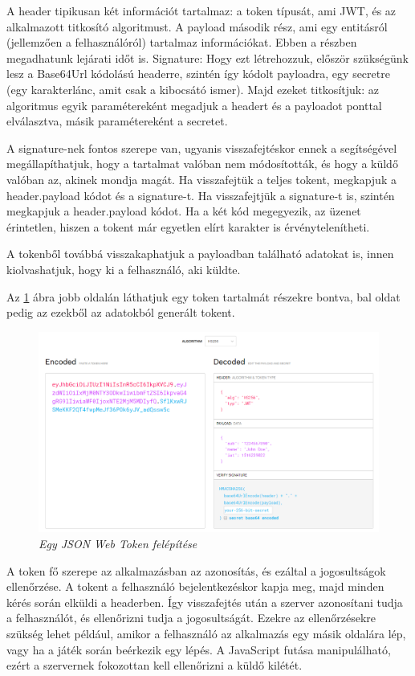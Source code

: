 A header tipikusan két információt tartalmaz: a token típusát, ami JWT, és az alkalmazott titkosító algoritmust.
A payload második rész, ami egy entitásról (jellemzően a felhasználóról) tartalmaz információkat. Ebben a részben megadhatunk lejárati időt is.
Signature: Hogy ezt létrehozzuk, először szükségünk lesz a Base64Url kódolású headerre, szintén így kódolt payloadra, egy secretre (egy karakterlánc, amit csak a kibocsátó ismer). Majd ezeket titkosítjuk: az algoritmus egyik paramétereként megadjuk a headert és a payloadot ponttal elválasztva, másik paramétereként a secretet.

A signature-nek fontos szerepe van, ugyanis visszafejtéskor ennek a segítségével megállapíthatjuk, hogy a tartalmat valóban nem módosították, és hogy a küldő valóban az, akinek mondja magát. Ha visszafejtük a teljes tokent, megkapjuk a header.payload kódot és a signature-t. Ha visszafejtjük a signature-t is, szintén megkapjuk a header.payload kódot. Ha a két kód megegyezik, az üzenet érintetlen, hiszen a tokent már egyetlen elírt karakter is érvénytelenítheti.

A tokenből továbbá visszakaphatjuk a payloadban található adatokat is, innen kiolvashatjuk, hogy ki a felhasználó, aki küldte.

Az \ref{fig:jwt} ábra jobb oldalán láthatjuk egy token tartalmát részekre bontva, bal oldat pedig az ezekből az adatokból generált tokent.

\begin{figure}[!h]
	\centering
	\includegraphics[width=0.95\linewidth]{kepek/jwt.png}
	\caption{\textit{Egy JSON Web Token felépítése}}
	\label{fig:jwt}
\end{figure}

A token fő szerepe az alkalmazásban az azonosítás, és ezáltal a jogosultságok ellenőrzése. A tokent a felhasználó bejelentkezéskor kapja meg, majd minden kérés során elküldi a headerben. Így visszafejtés után a szerver azonosítani tudja a felhasználót, és ellenőrizni tudja a jogosultságát. Ezekre az ellenőrzésekre szükség lehet például, amikor a felhasználó az alkalmazás egy másik oldalára lép, vagy ha a játék során beérkezik egy lépés. A JavaScript futása manipulálható, ezért a szervernek fokozottan kell ellenőrizni a küldő kilétét.

